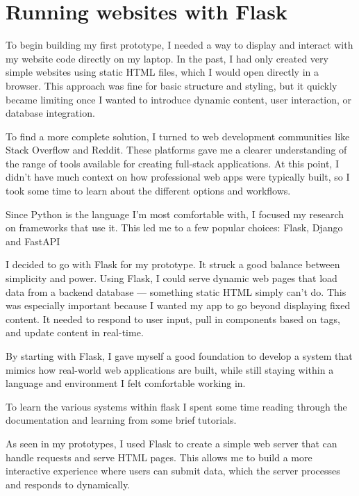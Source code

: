 \section{Running websites with Flask}
\label{research:RunningWebsitesFlask}
To begin building my first prototype, I needed a way to display and interact with my website code directly on my laptop. In the past, I had only created very simple websites using static HTML files, which I would open directly in a browser. This approach was fine for basic structure and styling, but it quickly became limiting once I wanted to introduce dynamic content, user interaction, or database integration.

To find a more complete solution, I turned to web development communities like Stack Overflow and Reddit. These platforms gave me a clearer understanding of the range of tools available for creating full-stack applications. At this point, I didn't have much context on how professional web apps were typically built, so I took some time to learn about the different options and workflows.

Since Python is the language I'm most comfortable with, I focused my research on frameworks that use it. This led me to a few popular choices: Flask, Django and FastAPI

I decided to go with Flask for my prototype. It struck a good balance between simplicity and power. Using Flask, I could serve dynamic web pages that load data from a backend database — something static HTML simply can't do. This was especially important because I wanted my app to go beyond displaying fixed content. It needed to respond to user input, pull in components based on tags, and update content in real-time.

By starting with Flask, I gave myself a good foundation to develop a system that mimics how real-world web applications are built, while still staying within a language and environment I felt comfortable working in.

To learn the various systems within flask I spent some time reading through the documentation \cite{WelcomeFlaskFlask} and learning from some brief tutorials.

As seen in my prototypes, I used Flask to create a simple web server that can handle requests and serve HTML pages. This allows me to build a more interactive experience where users can submit data, which the server processes and responds to dynamically.
